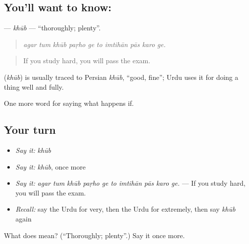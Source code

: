 \subsection*{You'll want to know: }
\textbf{} — \emph{khūb} — \textquotedblleft{}thoroughly; plenty\textquotedblright{}.

\begin{quote}
         
\end{quote}

\begin{quote}
\emph{agar tum khūb paṛho ge to imtihān pās karo ge.}
\end{quote}

\begin{quote}
If you study hard, you will pass the exam.
\end{quote}

\begin{cousinweb}
\textbf{} (\emph{khūb}) is usually traced to Persian \emph{khūb}, \textquotedblleft{}good, fine\textquotedblright{}; Urdu uses it for doing a thing well and fully.
\end{cousinweb}

\begin{grammarlens}[title={What you've built}]
One more word for saying what happens if.
\end{grammarlens}

\subsection*{Your turn}
\begin{itemize}
\raggedright
  \item \emph{Say it:} \emph{khūb}
  \item \emph{Say it:} \emph{khūb}, once more
  \item \emph{Say it:} \emph{agar tum khūb paṛho ge to imtihān pās karo ge.} — If you study hard, you will pass the exam.
  \item \emph{Recall:} say the Urdu for very, then the Urdu for extremely, then say \emph{khūb} again
\end{itemize}

\begin{tcolorbox}[breakable,colback=teal!4,colframe=teal!35!black,title={Before you move on}]
What does  mean? (\textquotedblleft{}Thoroughly; plenty\textquotedblright{}.) Say it once more.
\end{tcolorbox}
